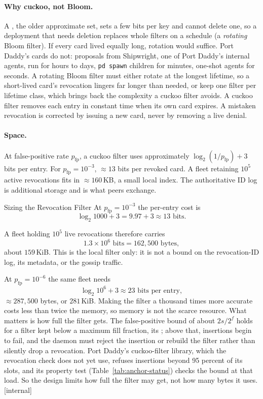 \documentclass[11pt,a4paper]{article}
\theoremstyle{definition}
\begin{document}
\paragraph{Why cuckoo, not Bloom.} A , the older approximate set, sets a few bits per key and cannot delete one, so a deployment that needs deletion replaces whole filters on a schedule (a \emph{rotating} Bloom filter). If every card lived equally long, rotation would suffice. Port Daddy's cards do not: proposals from Shipwright, one of Port Daddy's internal agents, run for hours to days, \texttt{pd spawn} children for minutes, one-shot agents for seconds. A rotating Bloom filter must either rotate at the longest lifetime, so a short-lived card's revocation lingers far longer than needed, or keep one filter per lifetime class, which brings back the complexity a cuckoo filter avoids. A cuckoo filter removes each entry in constant time when its own card expires. A mistaken revocation is corrected by issuing a new card, never by removing a live denial.

\paragraph{Space.} At false-positive rate $p_{\mathrm{fp}}$, a cuckoo filter uses approximately $\log_2(1/p_{\mathrm{fp}}) + 3$ bits per entry. For $p_{\mathrm{fp}} = 10^{-3}$, $\approx 13$ bits per revoked card. A fleet retaining $10^{5}$ active revocations fits in $\approx 160$\,KB, a small local index. The authoritative ID log is additional storage and is what peers exchange.

\begin{pdexample}{Sizing the Revocation Filter}
\setlength{\parskip}{4pt plus 1pt}
At $p_{\mathrm{fp}} = 10^{-3}$ the per-entry cost is
\[
\log_2 1000 + 3 = 9.97 + 3 \approx 13 \text{ bits}.
\]

A fleet holding $10^{5}$ live revocations therefore carries
\[
1.3 \times 10^{6} \text{ bits} = 162{,}500 \text{ bytes},
\]
about $159$\,KiB. This is the local filter only: it is not a bound on the
revocation-ID log, its metadata, or the gossip traffic.

At
$p_{\mathrm{fp}} = 10^{-6}$ the same fleet needs
\[
\log_2 10^{6} + 3 \approx 23 \text{ bits per entry},
\]
$\approx 287{,}500$ bytes, or $281$\,KiB. Making the filter a thousand times more
accurate costs less than twice the memory, so memory is not the scarce resource.
What matters is how full the filter gets. The false-positive bound of about
$2s/2^f$ holds for a filter kept below a maximum fill fraction, its
; above that, insertions begin to fail, and the daemon
must reject the insertion or rebuild the filter rather than silently drop a
revocation. Port Daddy's cuckoo-filter library, which the revocation check
does not yet use, refuses insertions beyond 95 percent of its slots, and its
property test (Table~\ref{tab:anchor-status}) checks the bound at that load.
So the design limits how full the filter may get, not how many bytes it uses.
[internal]
\end{pdexample}
\end{document}
